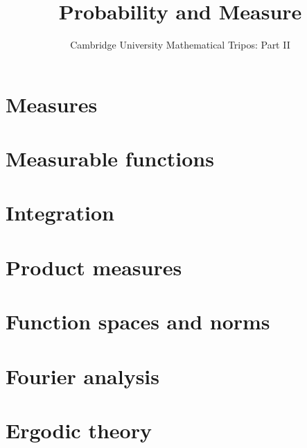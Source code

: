 \documentclass{article}
\title{Probability and Measure}
\author{Cambridge University Mathematical Tripos: Part II}
\begin{document}
\maketitle

\tableofcontentsnewpage{}

\section{Measures}

\section{Measurable functions}

\section{Integration}

\section{Product measures}

\section{Function spaces and norms}

\section{Fourier analysis}

\section{Ergodic theory}

\end{document}
